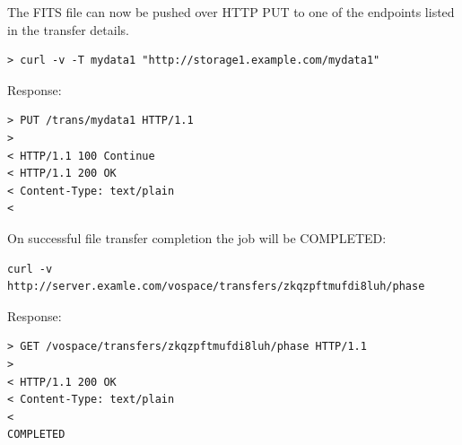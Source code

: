 \documentclass[11pt,a4paper]{ivoa}
\begin{document}
The FITS file can now be pushed over HTTP PUT to one of the endpoints listed in the transfer details.
\begin{lstlisting}
> curl -v -T mydata1 "http://storage1.example.com/mydata1"
\end{lstlisting}
Response:
\begin{lstlisting}
> PUT /trans/mydata1 HTTP/1.1
>
< HTTP/1.1 100 Continue
< HTTP/1.1 200 OK
< Content-Type: text/plain
<
\end{lstlisting}
On successful file transfer completion the job will be COMPLETED:
\begin{lstlisting}
curl -v http://server.examle.com/vospace/transfers/zkqzpftmufdi8luh/phase
\end{lstlisting}
Response:
\begin{lstlisting}
> GET /vospace/transfers/zkqzpftmufdi8luh/phase HTTP/1.1
>
< HTTP/1.1 200 OK
< Content-Type: text/plain
<
COMPLETED
\end{lstlisting}
\end{document}
